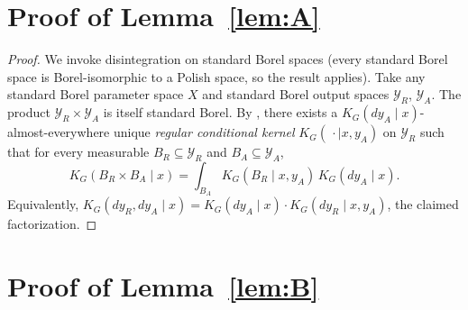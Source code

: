 \documentclass{article}
\theoremstyle{plain}
\theoremstyle{definition}
\theoremstyle{remark}
\newcommand{\YR}{\mathcal{Y}_R}
\newcommand{\YA}{\mathcal{Y}_A}
\begin{document}
\section{Proof of Lemma~\ref{lem:A}}\label{app:lem-A-proof}

\begin{proof}
We invoke disintegration on standard Borel spaces (every standard Borel
space is Borel-isomorphic to a Polish space, so the result applies). Take any
standard Borel parameter space $X$ and standard Borel output spaces $\YR$, $\YA$.
The product $\YR \times \YA$ is itself standard Borel. By \citet[Theorem~8.5]{kallenberg2021}, there exists a
$K_G(dy_A \mid x)$-almost-everywhere unique \emph{regular conditional kernel}
$K_G(\,\cdot \mid x, y_A)$ on $\YR$ such that for every measurable
$B_R \subseteq \YR$ and $B_A \subseteq \YA$,
\[
K_G(B_R \times B_A \mid x)
=
\int_{B_A} K_G(B_R \mid x, y_A)\, K_G(dy_A \mid x).
\]
Equivalently, $K_G(dy_R, dy_A \mid x) = K_G(dy_A \mid x) \cdot K_G(dy_R \mid x, y_A)$,
the claimed factorization.
\end{proof}

\section{Proof of Lemma~\ref{lem:B}}\label{app:lem-B-proof}
\end{document}
